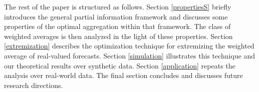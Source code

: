 \documentclass[12pt]{article}
\theoremstyle{definition}
\theoremstyle{definition}
\begin{document}
  
  
 
  
  



The rest of the paper is structured as follows. Section \ref{propertiesS} briefly
introduces the general partial information framework and discusses some properties of
the optimal aggregation within that framework. The class of weighted
averages is then analyzed in the light of these
properties. Section \ref{extremization} describes the optimization technique for extremizing the weighted average of
real-valued forecasts. Section \ref{simulation} illustrates this
technique and our theoretical results over synthetic
data. Section \ref{application} repeats the analysis over real-world data. The final section
concludes and discusses future research directions.
\end{document}
